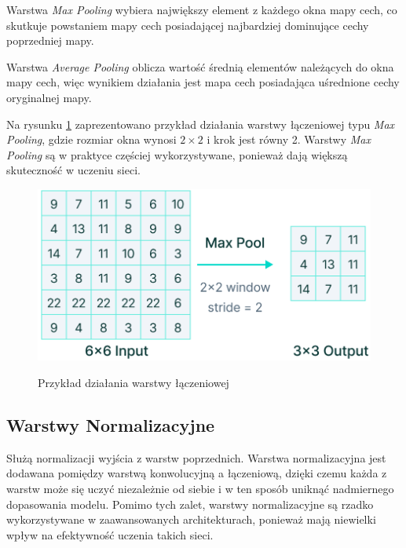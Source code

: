 Warstwa \textit{Max Pooling} wybiera największy element z każdego okna mapy cech, co skutkuje powstaniem mapy cech posiadającej najbardziej dominujące cechy poprzedniej mapy.

Warstwa \textit{Average Pooling} oblicza wartość średnią elementów należących do okna mapy cech, więc wynikiem działania jest mapa cech posiadająca uśrednione cechy oryginalnej mapy.

Na rysunku \ref{MaxPooling} zaprezentowano przykład działania warstwy łączeniowej typu \textit{Max Pooling}, gdzie rozmiar okna wynosi $2 \times 2$ i krok jest równy 2. Warstwy \textit{Max Pooling} są w praktyce częściej wykorzystywane, ponieważ dają większą skuteczność w uczeniu sieci.

\newpage
\begin{figure}[h]
\begin{center}
\includegraphics[width=15cm]{resources/figures/max-pool.png}
\caption{Przykład działania warstwy łączeniowej}
\label{MaxPooling}
\end{center}
\end{figure}

\vspace{-0.5cm}
\subsection{Warstwy Normalizacyjne}
Służą normalizacji wyjścia z warstw poprzednich. Warstwa normalizacyjna jest dodawana pomiędzy warstwą konwolucyjną a łączeniową, dzięki czemu każda z warstw może się uczyć niezależnie od siebie i w ten sposób uniknąć nadmiernego dopasowania modelu. Pomimo tych zalet, warstwy normalizacyjne są rzadko wykorzystywane w zaawansowanych architekturach, ponieważ mają niewielki wpływ na efektywność uczenia takich sieci.

